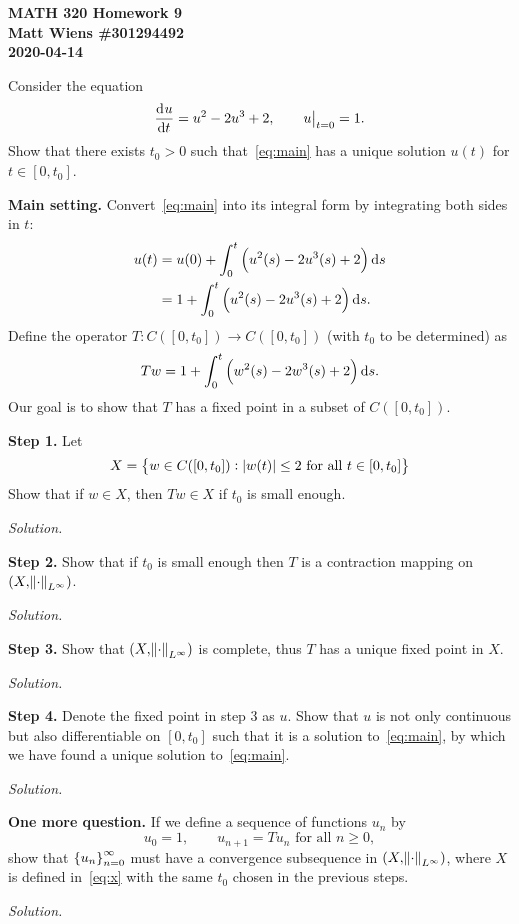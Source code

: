 \documentclass{article}
\begin{document}
\textbf{MATH 320 Homework 9} \\
\textbf{Matt Wiens \#301294492} \\
\textbf{2020-04-14}

Consider the equation
%
\begin{equation}
    \dod{u}{t} = u^2 - 2 u^3 + 2, \qquad \eval[1]{u}_{t = 0} = 1
    .
    \label{eq:main}
\end{equation}
%
Show that there exists $t_0 > 0$ such that~\eqref{eq:main}
has a unique solution $u(t)$ for $t \in [0, t_0]$.

\vspace{5mm}

\textbf{Main setting.} Convert~\eqref{eq:main} into its integral form by
integrating both sides in $t$:
%
\begin{align*}
    u(t) &= u(0) + \int_0^t \del{u^2(s) - 2 u^3(s) + 2} \dif s \\
         & = 1 + \int_0^t \del{u^2(s) - 2 u^3(s) + 2} \dif s
         .
\end{align*}
%
Define the operator $T: C([0, t_0]) \to C([0, t_0])$ (with $t_0$ to be
determined) as
%
\begin{equation*}
   Tw = 1 + \int_0^t \del{w^2(s) - 2 w^3(s) + 2} \dif s
   .
\end{equation*}
%
Our goal is to show that $T$ has a fixed point in a subset of $C([0,
t_0])$.

\newpage

\textbf{Step 1.}
Let
%
\begin{equation}
   X = \cbr{w \in C([0, t_0]):  |w(t)| \leq 2 \text{ for all $t \in [0, t_0]$}}
   \label{eq:x}
\end{equation}
%
Show that if $w \in X$, then $Tw \in X$ if $t_0$ is small enough.

\textit{Solution.}

\newpage

\textbf{Step 2.}
Show that if $t_0$ is small enough then $T$ is a contraction mapping on
$(X, \norm{\cdot}_{L^\infty})$.

\textit{Solution.}

\newpage

\textbf{Step 3.}
Show that $(X, \norm{\cdot}_{L^\infty})$ is complete, thus $T$ has a
unique fixed point in $X$.

\textit{Solution.}

\newpage

\textbf{Step 4.}
Denote the fixed point in step 3 as $u$. Show that $u$ is not only
continuous but also differentiable on $[0, t_0]$ such that it is a
solution to~\eqref{eq:main}, by which we have found a unique solution
to~\eqref{eq:main}.

\textit{Solution.}

\newpage

\textbf{One more question.}
If we define a sequence of functions $u_n$ by
%
\begin{equation*}
   u_0 = 1, \qquad u_{n+1} = Tu_n \text{ for all $n \geq 0$}
   ,
\end{equation*}
%
show that $\cbr{u_n}_{n = 0}^\infty$ must have a convergence subsequence
in $(X, \norm{\cdot}_{L^\infty})$, where $X$ is defined
in~\eqref{eq:x} with the same $t_0$ chosen in the previous steps.

\textit{Solution.}
\end{document}

